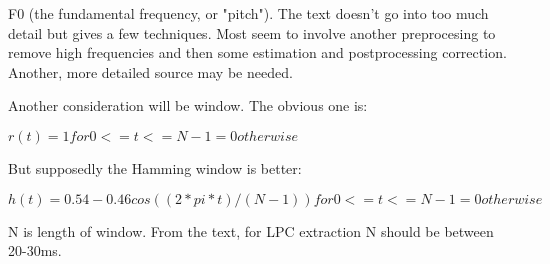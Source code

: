
\par
F0 (the fundamental frequency, or "pitch").
The text doesn't go into too much detail but gives a few techniques. Most
seem to involve another preprocesing to remove high frequencies and then
some estimation and postprocessing correction. Another, more detailed
source may be needed.

\par
Another consideration will be window. The obvious one is:

$r(t) = 1 for 0 <= t <= N-1
     = 0 otherwise$

\par
But supposedly the Hamming window is better:

$h(t) = 0.54 - 0.46 cos((2*pi*t)/(N-1)) for 0 <= t <= N-1
     = 0 otherwise$

\par
N is length of window. From the text, for LPC extraction N should be
between 20-30ms.
